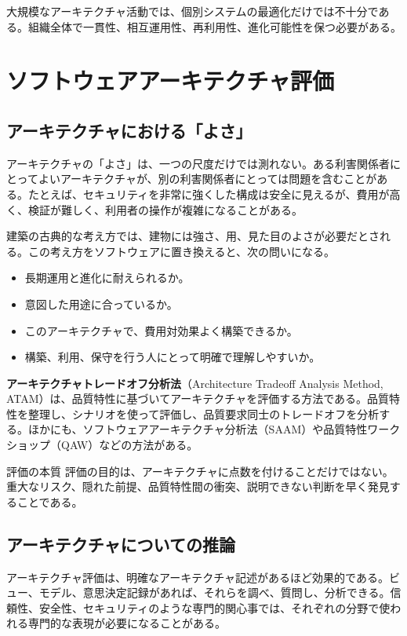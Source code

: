 \documentclass[a4paper,11pt]{ltjsarticle}
\newcommand{\keyterm}[1]{\textbf{#1}}
\newcommand{\en}[1]{（#1）}
\begin{document}
大規模なアーキテクチャ活動では、個別システムの最適化だけでは不十分である。組織全体で一貫性、相互運用性、再利用性、進化可能性を保つ必要がある。

\section{ソフトウェアアーキテクチャ評価}

\subsection{アーキテクチャにおける「よさ」}
アーキテクチャの「よさ」は、一つの尺度だけでは測れない。ある利害関係者にとってよいアーキテクチャが、別の利害関係者にとっては問題を含むことがある。たとえば、セキュリティを非常に強くした構成は安全に見えるが、費用が高く、検証が難しく、利用者の操作が複雑になることがある。

建築の古典的な考え方では、建物には強さ、用、見た目のよさが必要だとされる。この考え方をソフトウェアに置き換えると、次の問いになる。
\begin{itemize}
  \item 長期運用と進化に耐えられるか。
  \item 意図した用途に合っているか。
  \item このアーキテクチャで、費用対効果よく構築できるか。
  \item 構築、利用、保守を行う人にとって明確で理解しやすいか。
\end{itemize}

\keyterm{アーキテクチャトレードオフ分析法}\en{Architecture Tradeoff Analysis Method, ATAM}は、品質特性に基づいてアーキテクチャを評価する方法である。品質特性を整理し、シナリオを使って評価し、品質要求同士のトレードオフを分析する。ほかにも、ソフトウェアアーキテクチャ分析法\en{SAAM}や品質特性ワークショップ\en{QAW}などの方法がある。

\begin{statementbox}{評価の本質}
評価の目的は、アーキテクチャに点数を付けることだけではない。重大なリスク、隠れた前提、品質特性間の衝突、説明できない判断を早く発見することである。
\end{statementbox}

\subsection{アーキテクチャについての推論}
アーキテクチャ評価は、明確なアーキテクチャ記述があるほど効果的である。ビュー、モデル、意思決定記録があれば、それらを調べ、質問し、分析できる。信頼性、安全性、セキュリティのような専門的関心事では、それぞれの分野で使われる専門的な表現が必要になることがある。
\end{document}
